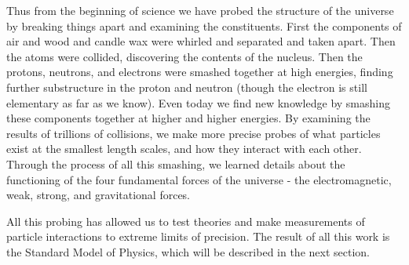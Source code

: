 Thus from the beginning of science we have probed the structure of the universe by breaking things apart and examining the constituents. First the components of air and wood and candle wax were whirled and separated and taken apart. Then the atoms were collided, discovering the contents of the nucleus. Then the protons, neutrons, and electrons were smashed together at high energies, finding further substructure in the proton and neutron (though the electron is still elementary as far as we know). Even today we find new knowledge by smashing these components together at higher and higher energies. By examining the results of trillions of collisions, we make more precise probes of what particles exist at the smallest length scales, and how they interact with each other. Through the process of all this smashing, we learned details about the functioning of the four fundamental forces of the universe - the electromagnetic, weak, strong, and gravitational forces.

All this probing has allowed us to test theories and make measurements of particle interactions to extreme limits of precision. The result of all this work is the Standard Model of Physics, which will be described in the next section.